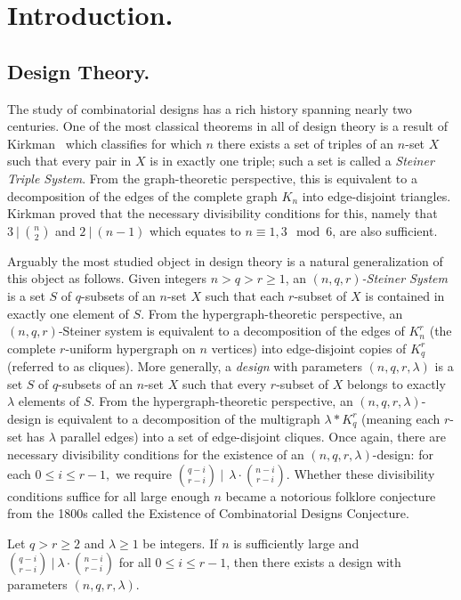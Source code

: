 \documentclass[twoside,leqno]{article}
\begin{document}
\section{Introduction.}

\subsection{Design Theory.}

The study of combinatorial designs has a rich history spanning nearly two centuries. One of the most classical theorems in all of design theory is a result of Kirkman~\cite{K47} which classifies for which $n$ there exists a set of triples of an $n$-set $X$ such that every pair in $X$ is in exactly one triple; such a set is called a \emph{Steiner Triple System}. From the graph-theoretic perspective, this is equivalent to a decomposition of the edges of the complete graph $K_n$ into edge-disjoint triangles. Kirkman proved that the necessary divisibility conditions for this, namely that $3~|~\binom{n}{2}$ and $2~|~(n-1)$ which equates to $n\equiv 1,3 \mod 6$, are also sufficient. 

Arguably the most studied object in design theory is a natural generalization of this object as follows. Given integers $n > q > r \geq 1$, an $(n,q,r)$\textit{-Steiner System} is a set $S$ of $q$-subsets of an $n$-set $X$ such that each $r$-subset of $X$ is contained in exactly one element of $S$. From the hypergraph-theoretic perspective, an $(n,q,r)$-Steiner system is equivalent to a decomposition of the edges of $K_n^r$ (the complete $r$-uniform hypergraph on $n$ vertices) into edge-disjoint copies of $K_q^r$ (referred to as cliques). More generally, a \emph{design} with parameters $(n,q,r,\lambda)$ is a set $S$ of $q$-subsets of an $n$-set $X$ such that every $r$-subset of $X$ belongs to exactly $\lambda$ elements of $S$. From the hypergraph-theoretic perspective, an $(n,q,r,\lambda)$-design is equivalent to a decomposition of the multigraph $\lambda*K_q^r$ (meaning each $r$-set has $\lambda$ parallel edges) into a set of edge-disjoint cliques.  Once again, there are necessary divisibility conditions for the existence of an $(n, q, r, \lambda)$-design: for each $0 \leq i \leq r-1,$ we require $\binom{q-i}{r-i}~|~~\lambda\cdot \binom{n-i}{r-i}$.
Whether these divisibility conditions suffice for all large enough $n$ became a notorious folklore conjecture from the 1800s called the Existence of Combinatorial Designs Conjecture.

\begin{conj}\label{conj:Existence}
Let $q > r \ge 2$ and $\lambda \geq 1$ be integers. If $n$ is sufficiently large and $\binom{q-i}{r-i}~|~\lambda \cdot \binom{n-i}{r-i}$ for all $0\le i \le r-1$, then there exists a design with parameters $(n,q,r,\lambda)$.
\end{conj}
\end{document}
